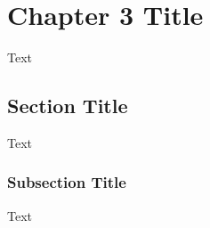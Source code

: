 \chapter{Chapter 3 Title}\label{chap3}
Text

\section{Section Title}  %
Text

\subsection{Subsection Title} %
Text